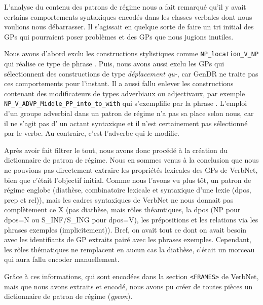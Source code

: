 L'analyse du contenu des patrons de régime nous a fait remarqué qu'il y avait certains comportements syntaxiques encodés dans les classes verbales dont nous voulions nous débarrasser. Il s'agissait en quelque sorte de faire un tri initial des \acp{GP} qui pourraient poser problèmes et des \acp{GP} que nous jugions inutiles. 

Nous avons d'abord exclu les constructions stylistiques comme \lstinline|NP_location_V_NP| qui réalise ce type de phrase . Puis, nous avons aussi exclu les \acp{GP} qui sélectionnent des constructions de type \emph{déplacement qu-}, car GenDR ne traite pas ces comportements pour l'instant. Il a aussi fallu enlever les constructions contenant des modificateurs de types adverbiaux ou adjectivaux, par exemple \lstinline|NP_V_ADVP_Middle_PP_into_to_with| qui s'exemplifie par la phrase . L'emploi d'un groupe adverbial dans un patron de régime n'a pas sa place selon nous, car il ne s'agit pas d' un actant syntaxique et il n'est certainement pas sélectionné par le verbe. Au contraire, c'est l'adverbe qui le modifie.

Après avoir fait filtrer le tout, nous avons donc procédé à la création du dictionnaire de patron de régime. Nous en sommes venus à la conclusion que nous ne pouvions pas directement extraire les propriétés lexicales des \acp{GP} de VerbNet, bien que c'était l'objectif initial. Comme nous l'avons vu plus tôt, un patron de régime englobe (diathèse, combinatoire lexicale et syntaxique d'une lexie (dpos, prep et rel)), mais les cadres syntaxiques de VerbNet ne nous donnait pas complètement ce X (pas diathèse, mais rôles théamtiques, la dpos (NP pour dpos=N ou S\_INF/S\_ING pour dpos=V), les prépositions et les relations via les phrases exemples (implicitement)). Bref, on avait tout ce dont on avait besoin avec les identifiants de GP extraits pairé avec les phrases exemples. Cependant, les rôles thématiques ne remplacent en aucun cas la diathèse, c'était un morceau qui aura fallu encoder manuellement.

Grâce à ces informations, qui sont encodées dans la section \texttt{<FRAMES>} de VerbNet, mais que nous avons extraits et encodé, nous avons pu créer de toutes pièces un dictionnaire de patron de régime (\emph{gpcon}).

